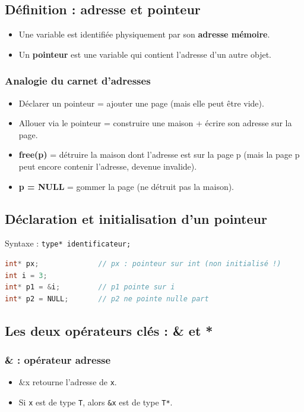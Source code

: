\subsection{Définition : adresse et pointeur}
\begin{itemize}
  \item Une variable est identifiée physiquement par son \textbf{adresse mémoire}.
  \item Un \textbf{pointeur} est une variable qui contient l’adresse d’un autre objet. 
\end{itemize}

\subsubsection{Analogie du carnet d’adresses}
\begin{itemize}
  \item Déclarer un pointeur = ajouter une page (mais elle peut être vide).
  \item Allouer via le pointeur = construire une maison + écrire son adresse sur la page.
  \item \textbf{free(p)} = détruire la maison dont l’adresse est sur la page p (mais la page p peut encore contenir l’adresse, devenue invalide). 
  \item \textbf{p = NULL} = gommer la page (ne détruit pas la maison). 
\end{itemize}

\subsection{Déclaration et initialisation d’un pointeur}
Syntaxe : \texttt{type* identificateur;} 
\begin{lstlisting}[language=C]
int* px;              // px : pointeur sur int (non initialisé !)
int i = 3;
int* p1 = &i;         // p1 pointe sur i
int* p2 = NULL;       // p2 ne pointe nulle part
\end{lstlisting}

\subsection{Les deux opérateurs clés : \& et *}
\subsubsection{\& : opérateur adresse}
\begin{itemize}
  \item \&x retourne l’adresse de \texttt{x}.
  \item Si \texttt{x} est de type \texttt{T}, alors \texttt{\&x} est de type \texttt{T*}.
\end{itemize}

